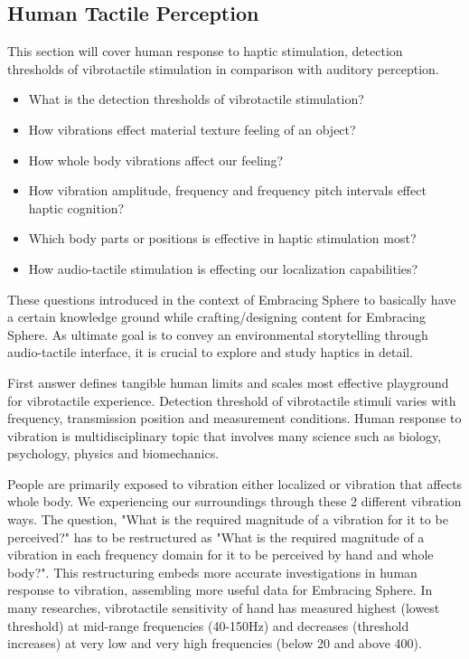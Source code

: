         \subsection{Human Tactile Perception}
            This section will cover human response to haptic stimulation, detection thresholds of vibrotactile stimulation in comparison with auditory perception.\par

            \begin{itemize}
                \item What is the detection thresholds of vibrotactile stimulation?
                \item How vibrations effect material texture feeling of an object?
                \item How whole body vibrations affect our feeling?
                \item How vibration amplitude, frequency and frequency pitch intervals effect haptic cognition?
                \item Which body parts or positions is effective in haptic stimulation most?
                \item How audio-tactile stimulation is effecting our localization capabilities?
            \end{itemize}

            These questions introduced in the context of Embracing Sphere to basically have a certain knowledge ground while crafting/designing content for Embracing Sphere. As ultimate goal is to convey an environmental storytelling through audio-tactile interface, it is crucial to explore and study haptics in detail.\par

            First answer defines tangible human limits and scales most effective playground for vibrotactile experience. Detection threshold of vibrotactile stimuli varies with frequency, transmission position and measurement conditions. Human response to vibration is multidisciplinary topic that involves many science such as biology, psychology, physics and biomechanics\cite{Human_Response_to_Vibration}.\par

            People are primarily exposed to vibration either localized or vibration that affects whole body\cite{Human_Response_to_Vibration}. We experiencing our surroundings through these 2 different vibration ways. The question, "What is the required magnitude of a vibration for it to be perceived?" has to be restructured as "What is the required magnitude of a vibration in each frequency domain for it to be perceived by hand and whole body?". This restructuring embeds more accurate investigations in human response to vibration, assembling more useful data for Embracing Sphere. In many researches\cite{Human_Response_to_Vibration}\cite{Consonance_of_Vibrotactile_Chords}\cite{Threshold_of_Stimulation_Levels}\cite{Whole-Body_Vibration_Perception_Thresholds}, vibrotactile sensitivity of hand has measured highest (lowest threshold) at mid-range frequencies (40-150Hz) and decreases (threshold increases) at very low and very high frequencies (below 20 and above 400).\par

